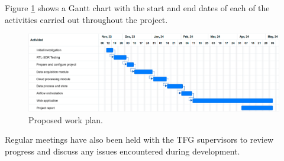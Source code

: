 Figure \ref{fig:gantt-diagram-en} shows a Gantt chart with the start and end dates of each of the activities carried out throughout the project.

\begin{figure}[h]
	\centering
	\includegraphics[width=1\textwidth]{Imagenes/Chapter_1/gant_en.png}
	\caption{Proposed work plan.}
	\label{fig:gantt-diagram-en}
\end{figure}

\noindent Regular meetings have also been held with the TFG supervisors to review progress and discuss any issues encountered during development.